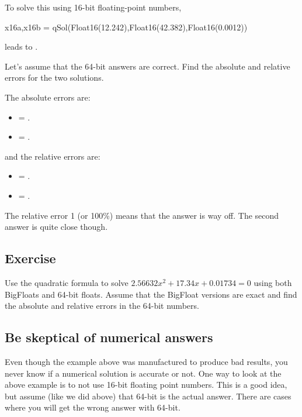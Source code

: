 To solve this using 16-bit floating-point numbers, 
\begin{jlblock}[root]
x16a,x16b = qSol(Float16(12.242),Float16(42.382),Float16(0.0012))
\end{jlblock}
%
leads to  \printpythontex[verb].

Let's assume that the 64-bit answers are correct. Find the absolute and relative errors for the two solutions.

The absolute errors are:
  \begin{itemize}
  \item {} =  \printpythontex[verb].
  \item {} =  \printpythontex[verb].
\end{itemize}
  and the relative errors are:
  \begin{itemize}
  \item {} =  \printpythontex[verb].
  \item {} =  \printpythontex[verb].
\end{itemize}

The relative error 1 (or 100\%) means that the answer is way off.  The second answer is quite close though. 


\subsection{Exercise}

Use the quadratic formula to solve $2.56632x^{2}+ 17.34x+ 0.01734=0$
using both BigFloats and 64-bit floats. Assume that the BigFloat
versions are exact and find the absolute and relative errors in the
64-bit numbers.


\subsection{Be skeptical of numerical answers}

Even though the example above was manufactured to produce bad results,
you never know if a numerical solution is accurate or not. One way to look at the above example is to not use 16-bit floating point numbers.  This is a good idea, but assume (like we did above) that 64-bit is the actual answer.  There are cases where you will get the wrong answer with 64-bit. 


